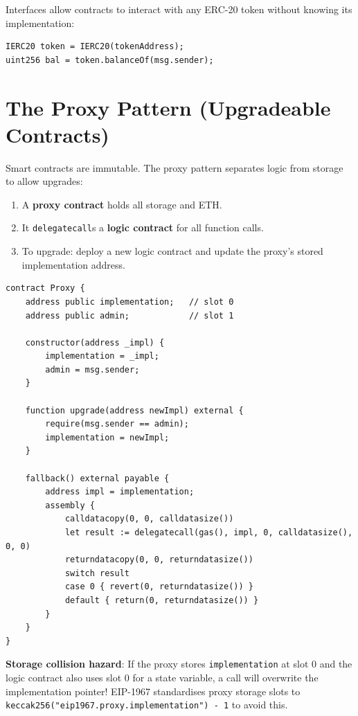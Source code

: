 \documentclass[12pt,a4paper,openany]{book}
\theoremstyle{definition}
\theoremstyle{plain}
\theoremstyle{remark}
\begin{document}
Interfaces allow contracts to interact with any ERC-20 token without
knowing its implementation:
\begin{lstlisting}[language=Solidity]
IERC20 token = IERC20(tokenAddress);
uint256 bal = token.balanceOf(msg.sender);
\end{lstlisting}

\section{The Proxy Pattern (Upgradeable Contracts)}

Smart contracts are immutable.  The proxy pattern separates logic from
storage to allow upgrades:

\begin{enumerate}
  \item A \textbf{proxy contract} holds all storage and ETH.
  \item It \texttt{delegatecall}s a \textbf{logic contract} for all
        function calls.
  \item To upgrade: deploy a new logic contract and update the proxy's
        stored implementation address.
\end{enumerate}

\begin{lstlisting}[language=Solidity,caption=Minimal transparent proxy]
contract Proxy {
    address public implementation;   // slot 0
    address public admin;            // slot 1

    constructor(address _impl) {
        implementation = _impl;
        admin = msg.sender;
    }

    function upgrade(address newImpl) external {
        require(msg.sender == admin);
        implementation = newImpl;
    }

    fallback() external payable {
        address impl = implementation;
        assembly {
            calldatacopy(0, 0, calldatasize())
            let result := delegatecall(gas(), impl, 0, calldatasize(), 0, 0)
            returndatacopy(0, 0, returndatasize())
            switch result
            case 0 { revert(0, returndatasize()) }
            default { return(0, returndatasize()) }
        }
    }
}
\end{lstlisting}

\begin{exambox}
  \textbf{Storage collision hazard}: If the proxy stores
  \texttt{implementation} at slot 0 and the logic contract also uses
  slot 0 for a state variable, a call will overwrite the implementation
  pointer!  EIP-1967 standardises proxy storage slots to
  \texttt{keccak256("eip1967.proxy.implementation") - 1} to avoid this.
\end{exambox}
\end{document}
